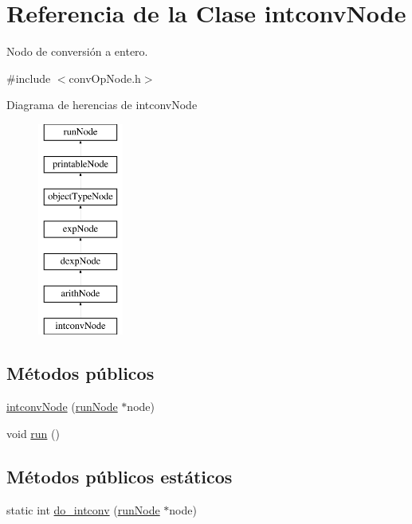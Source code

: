 \hypertarget{classintconvNode}{\section{Referencia de la Clase intconv\-Node}
\label{classintconvNode}
}


Nodo de conversión a entero.  




{\ttfamily \#include $<$conv\-Op\-Node.\-h$>$}

Diagrama de herencias de intconv\-Node\begin{figure}[H]
\begin{center}
\leavevmode
\includegraphics[height=7.000000cm]{classintconvNode}
\end{center}
\end{figure}
\subsection*{Métodos públicos}
\begin{DoxyCompactItemize}
\item 
\hyperlink{classintconvNode_a40e4dfa07c7500d5b58b007620bcc686}{intconv\-Node} (\hyperlink{classrunNode}{run\-Node} $\ast$node)
\item 
void \hyperlink{classintconvNode_a70bf0fffc52d33f453f3d798f1147d99}{run} ()
\end{DoxyCompactItemize}
\subsection*{Métodos públicos estáticos}
\begin{DoxyCompactItemize}
\item 
static int \hyperlink{classintconvNode_a0cba67960f9be44ce403581d76c01f30}{do\-\_\-intconv} (\hyperlink{classrunNode}{run\-Node} $\ast$node)
\end{DoxyCompactItemize}
